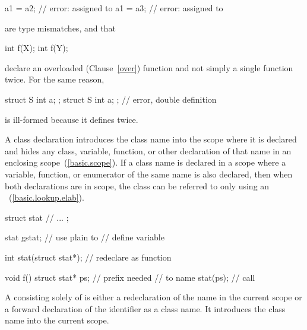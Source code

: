 \begin{codeblock}
a1 = a2;                        // error:  assigned to 
a1 = a3;                        // error:  assigned to 
\end{codeblock}

are type mismatches, and that

\begin{codeblock}
int f(X);
int f(Y);
\end{codeblock}

%
declare an overloaded (Clause~\ref{over}) function  and not
simply a single function  twice. For the same reason,

\begin{codeblock}
struct S { int a; };
struct S { int a; };            // error, double definition
\end{codeblock}

is ill-formed because it defines  twice.
\exitexample

\pnum
{}%
%
A class declaration introduces the class name into the scope where
%
it is declared and hides any
class, variable, function, or other declaration of that name in an
enclosing scope~(\ref{basic.scope}). If a class name is declared in a
scope where a variable, function, or enumerator of the same name is also
declared, then when both declarations are in scope, the class can be
referred to only using an
~(\ref{basic.lookup.elab}).
\enterexample

\begin{codeblock}
struct stat {
  // ...
};

stat gstat;                     // use plain  to
                                // define variable

int stat(struct stat*);         // redeclare  as function

void f() {
  struct stat* ps;              //  prefix needed
                                // to name 
  stat(ps);                     // call 
}
\end{codeblock}
\exitexample
{}%
%
A  consisting solely of  is either a redeclaration of the name in the current scope
or a forward declaration of the identifier as a class name. It
introduces the class name into the current scope.
\enterexample

